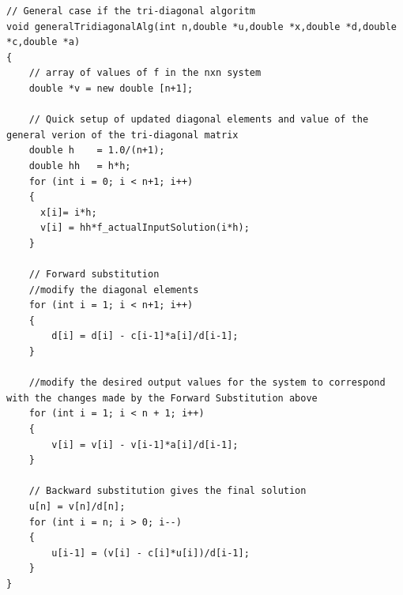 \documentclass[11pt, oneside]{article}   	%
\begin{document}
\begin{lstlisting}
// General case if the tri-diagonal algoritm
void generalTridiagonalAlg(int n,double *u,double *x,double *d,double *c,double *a)
{
    // array of values of f in the nxn system
    double *v = new double [n+1];

    // Quick setup of updated diagonal elements and value of the general verion of the tri-diagonal matrix
    double h    = 1.0/(n+1);
    double hh   = h*h;
    for (int i = 0; i < n+1; i++)
    {
      x[i]= i*h;
      v[i] = hh*f_actualInputSolution(i*h);
    }

    // Forward substitution
    //modify the diagonal elements
    for (int i = 1; i < n+1; i++)
    {
        d[i] = d[i] - c[i-1]*a[i]/d[i-1];
    }

    //modify the desired output values for the system to correspond with the changes made by the Forward Substitution above
    for (int i = 1; i < n + 1; i++)
    {
        v[i] = v[i] - v[i-1]*a[i]/d[i-1];
    }

    // Backward substitution gives the final solution
    u[n] = v[n]/d[n];
    for (int i = n; i > 0; i--)
    {
        u[i-1] = (v[i] - c[i]*u[i])/d[i-1];
    }
}

\end{lstlisting}
\end{document}
